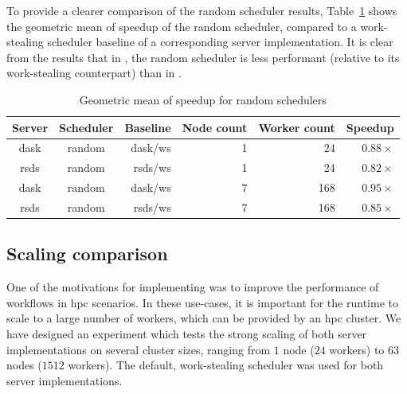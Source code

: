 To provide a clearer comparison of the random scheduler results, Table~\ref{tab:rsds-random-geom-mean-speedup}
shows the geometric mean of speedup of the random scheduler, compared to a work-stealing scheduler
baseline of a corresponding server implementation. It is clear from the results that in
\rsds{}, the random scheduler is less performant (relative to its work-stealing
counterpart) than in \dask{}.

\setlength{\tabcolsep}{5pt}
\begin{table}
	\centering
	\begin{tabular}{c|c|r|r|r|r}
		\textbf{Server}      & \textbf{Scheduler} & \textbf{Baseline} & \textbf{Node count} &
		\textbf{Worker	count} & \textbf{Speedup}                                                   \\
		\midrule
		dask                 & random             & dask/ws           & 1                   & 24
		                     & $0.88\times$                                                       \\
		rsds                 & random             & rsds/ws           & 1                   & 24
		                     & $0.82\times$                                                       \\
		dask                 & random             & dask/ws           & 7                   & 168
		                     & $0.95\times$                                                       \\
		rsds                 & random             & rsds/ws           & 7                   & 168
		                     & $0.85\times$                                                       \\
	\end{tabular}
	\caption{Geometric mean of speedup for random schedulers}
	\label{tab:rsds-random-geom-mean-speedup}
\end{table}

\subsection*{Scaling comparison}
One of the motivations for implementing \rsds{} was to improve the performance
of \dask{} workflows in \gls{hpc} scenarios. In these
use-cases, it is important for the runtime to scale to a large number of workers, which can be
provided by an \gls{hpc} cluster. We have designed an experiment which tests the
strong scaling of both server implementations on several cluster sizes, ranging from
$1$ node ($24$ workers) to $63$
nodes ($1512$ workers). The default, work-stealing scheduler was used for both
server implementations.


